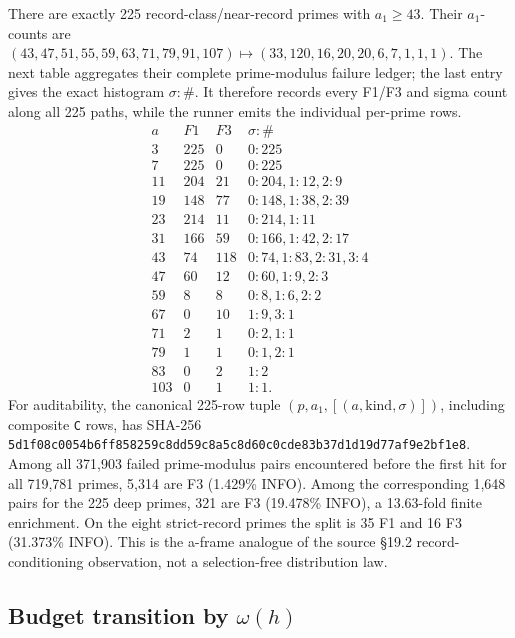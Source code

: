 \documentclass[10pt,reqno]{amsart}
\theoremstyle{definition}
\newcommand{\1}{\mathbf 1}
\begin{document}
There are exactly 225 record-class/near-record primes with $a_1\geq43$.
Their $a_1$-counts are
$(43,47,51,55,59,63,71,79,91,107)\mapsto
(33,120,16,20,20,6,7,1,1,1)$.  The next table aggregates their complete
prime-modulus failure ledger; the last entry gives the exact histogram
$\sigma:\#$.  It therefore records every F1/F3 and sigma count along all
225 paths, while the runner emits the individual per-prime rows.
\begin{equation}
\begin{array}{r|r|r|l}
a&F1&F3&\sigma:\#\\ \hline
3&225&0&0:225\\7&225&0&0:225\\
11&204&21&0:204,1:12,2:9\\
19&148&77&0:148,1:38,2:39\\
23&214&11&0:214,1:11\\
31&166&59&0:166,1:42,2:17\\
43&74&118&0:74,1:83,2:31,3:4\\
47&60&12&0:60,1:9,2:3\\
59&8&8&0:8,1:6,2:2\\
67&0&10&1:9,3:1\\
71&2&1&0:2,1:1\\79&1&1&0:1,2:1\\
83&0&2&1:2\\103&0&1&1:1.
\end{array}                                                        \tag{72.11}
\end{equation}
For auditability, the canonical 225-row tuple
$(p,a_1,[(a,\mathrm{kind},\sigma)])$, including composite \texttt{C} rows, has
SHA-256
\texttt{5d1f08c0054b6ff858259c8dd59c8a5c8d60c0cde83b37d1d19d77af9e2bf1e8}.
Among all 371,903 failed prime-modulus pairs encountered before the first hit
for all 719,781 primes, 5,314 are F3 (1.429\% INFO).  Among the corresponding
1,648 pairs for the 225 deep primes, 321 are F3 (19.478\% INFO), a 13.63-fold
finite enrichment.  On the eight strict-record primes the split is 35 F1 and
16 F3 (31.373\% INFO).  This is the a-frame analogue of the source \S19.2
record-conditioning observation, not a selection-free distribution law.

\subsection{Budget transition by $\omega(h)$}
\end{document}
